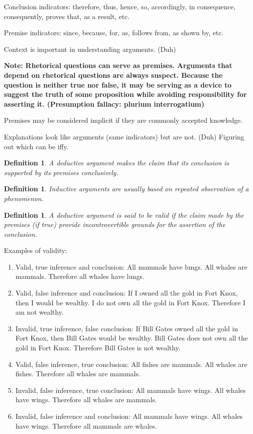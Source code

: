 \documentclass[5pt]{book}
\newtheorem{definition}[theorem]{Definition}
\begin{document}
Conclusion indicators: therefore, thus, hence, so, accordingly, in consequence,
consequently, proves that, as a result, etc.

Premise indicators: since, because, for, as, follows from, as shown by, etc.

Context is important in understanding arguments. (Duh)

\textbf{Note: Rhetorical questions can serve as premises. Arguments that depend 
on rhetorical questions are always suspect. Because the question is neither true 
nor false, it may be serving as a device to suggest the truth of some proposition 
while avoiding responsibility for asserting it. (Presumption fallacy: plurium 
interrogatium)}

Premises may be considered implicit if they are commonly accepted knowledge.

Explanations look like arguments (same indicators) but are not. (Duh) Figuring 
out which can be iffy.

\begin{definition}
    A deductive argument makes the claim that its conclusion is supported by its
    premises conclusively.
\end{definition}

\begin{definition}
    Inductive arguments are usually based on repeated observation of a phenomenon.
\end{definition}

\begin{definition}
    A deductive argument is said to be valid if the claim made by the premises 
    (if true) provide incontrovertible grounds for the assertion of the 
    conclusion. 
\end{definition}

Examples of validity:

\begin{enumerate}
    \item Valid, true inference and conclusion: All mammals have lungs. All whales 
        are mammals. Therefore all whales have lungs.
    \item Valid, false inference and conclusion: If I owned all the gold in Fort Knox, 
        then I would be wealthy. I do not own all the gold in Fort Knox. Therefore I 
        am not wealthy.
    \item Invalid, true inference, false conclusion: If Bill Gates owned all the gold 
        in Fort Knox, then Bill Gates would be wealthy. Bill Gates does not own all 
        the gold in Fort Knox. Therefore Bill Gates is not wealthy.
    \item Valid, false inference, true conclusion: All fishes are mammals. All whales 
        are fishes. Therefore all whales are mammals.
    \item Invalid, false inference, true conclusion: All mammals have wings. All whales 
        have wings. Therefore all whales are mammals.
    \item Invalid, false inference and conclusion: All mammals have wings. All whales 
        have wings. Therefore all mammals are whales.
\end{enumerate}
\end{document}
